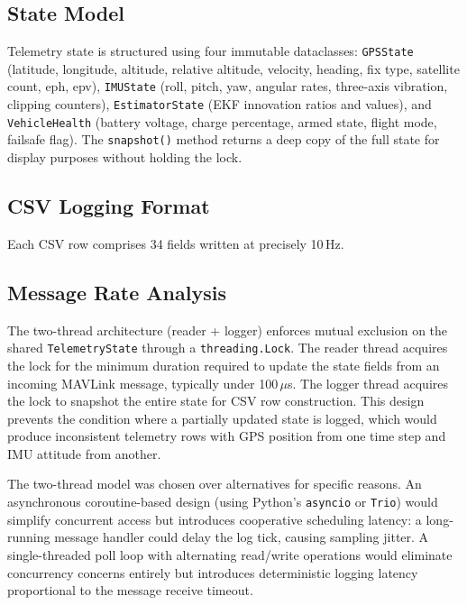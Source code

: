 \subsection{State Model}

Telemetry state is structured using four immutable dataclasses: \texttt{GPSState} (latitude, longitude, altitude, relative altitude, velocity, heading, fix type, satellite count, eph, epv), \texttt{IMUState} (roll, pitch, yaw, angular rates, three-axis vibration, clipping counters), \texttt{EstimatorState} (EKF innovation ratios and values), and \texttt{VehicleHealth} (battery voltage, charge percentage, armed state, flight mode, failsafe flag). The \texttt{snapshot()} method returns a deep copy of the full state for display purposes without holding the lock.

\subsection{CSV Logging Format}

Each CSV row comprises 34 fields written at precisely 10\,Hz.

\subsection{Message Rate Analysis}

The two-thread architecture (reader + logger) enforces mutual exclusion on the shared \texttt{TelemetryState} through a \texttt{threading.Lock}. The reader thread acquires the lock for the minimum duration required to update the state fields from an incoming MAVLink message, typically under 100\,$\mu$s. The logger thread acquires the lock to snapshot the entire state for CSV row construction. This design prevents the condition where a partially updated state is logged, which would produce inconsistent telemetry rows with GPS position from one time step and IMU attitude from another.

The two-thread model was chosen over alternatives for specific reasons. An asynchronous coroutine-based design (using Python's \texttt{asyncio} or \texttt{Trio}) would simplify concurrent access but introduces cooperative scheduling latency: a long-running message handler could delay the log tick, causing sampling jitter. A single-threaded poll loop with alternating read/write operations would eliminate concurrency concerns entirely but introduces deterministic logging latency proportional to the message receive timeout.

